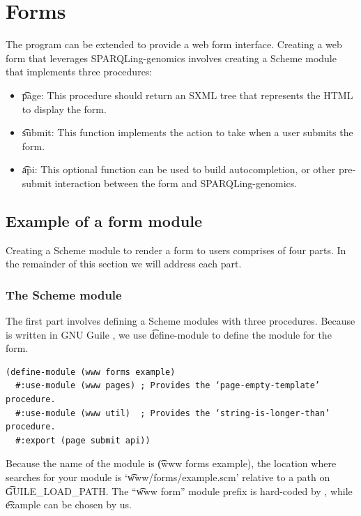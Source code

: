 \section{Forms}
\label{sec:forms}

  The  program can be extended to provide a web form interface.
  Creating a web form that leverages SPARQLing-genomics involves creating a
  Scheme module that implements three procedures:
  \begin{itemize}
  \item \t{page}: This procedure should return an SXML tree that represents
    the HTML to display the form.
  \item \t{submit}: This function implements the action to take when a user
    submits the form.
  \item \t{api}: This optional function can be used to build autocompletion,
    or other pre-submit interaction between the form and SPARQLing-genomics.
  \end{itemize}

\subsection{Example of a form module}

  Creating a Scheme module to render a form to users comprises of four
  parts.  In the remainder of this section we will address each part.

\subsubsection{The Scheme module}

  The first part involves defining a Scheme modules with three procedures.
  Because  is written in GNU Guile \citep{guile},
  we use \t{define-module} to define the module for the form.

\begin{siderules}
\begin{verbatim}
(define-module (www forms example)
  #:use-module (www pages) ; Provides the ‘page-empty-template’ procedure.
  #:use-module (www util)  ; Provides the ‘string-is-longer-than’ procedure.
  #:export (page submit api))
\end{verbatim}
\end{siderules}

  Because the name of the module is \t{(www forms example)}, the location
  where  searches for your module is `\t{www/forms/example.scm}'
  relative to a path on \t{GUILE\_LOAD\_PATH}.  The ``\t{www form}'' module
  prefix is hard-coded by , while \t{example} can be chosen by
  us.

